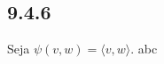 \documentclass[../main.tex]{subfiles}
\begin{document}
\subsection*{9.4.6}
Seja $\psi(v,w)=\langle v,w\rangle$. abc
\end{document}
